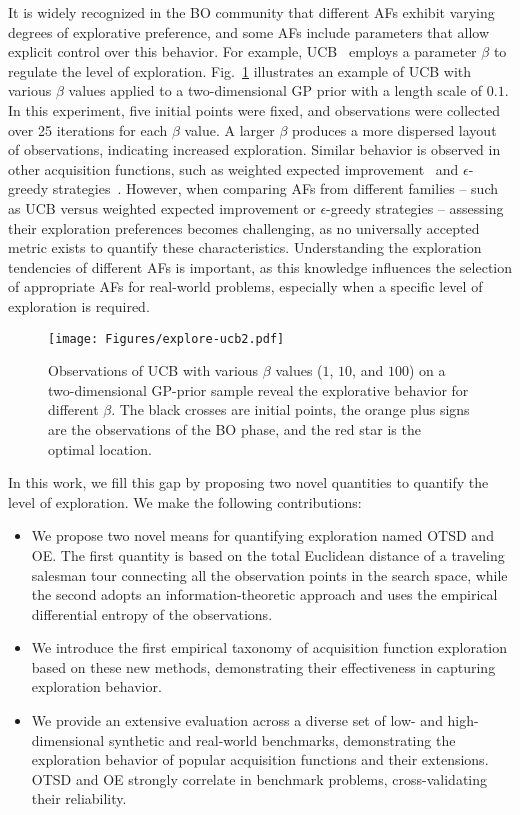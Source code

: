 \documentclass[accepted]{uai2025}
\begin{document}
It is widely recognized in the \ac{BO} community that different \acp{AF} exhibit varying degrees of explorative preference, and some \acp{AF} include parameters that allow explicit control over this behavior. For example, \ac{UCB}~\citep{srinivas2010gaussian} employs a parameter $\beta$ to regulate the level of exploration. Fig.~\ref{fig:intro_ucb} illustrates an example of \ac{UCB} with various $\beta$ values applied to a two-dimensional GP prior with a length scale of $0.1$. In this experiment, five initial points were fixed, and observations were collected over 25 iterations for each $\beta$ value. A larger $\beta$ produces a more dispersed layout of observations, indicating increased exploration. Similar behavior is observed in other acquisition functions, such as weighted expected improvement~\citep{sobester2005design} and $\epsilon$-greedy strategies~\citep{sutton2018reinforcement}. However, when comparing \acp{AF} from different families -- such as \ac{UCB} versus weighted expected improvement or $\epsilon$-greedy strategies -- assessing their exploration preferences becomes challenging, as no universally accepted metric exists to quantify these characteristics. Understanding the exploration tendencies of different \acp{AF} is important, as this knowledge influences the selection of appropriate \acp{AF} for real-world problems, especially when a specific level of exploration is required.


\begin{figure}[tb]
	\centering
	\texttt{[image: Figures/explore-ucb2.pdf]}
	\caption{
    Observations of \acs{UCB} with various $\beta$ values ($1$, $10$, and $100$) on a two-dimensional \ac{GP}-prior sample reveal the explorative behavior for different $\beta$. The black crosses are initial points, the orange plus signs are the observations of the \ac{BO} phase, and the red star is the optimal location.
    }
	\label{fig:intro_ucb}
\end{figure}

In this work, we fill this gap by proposing two novel quantities to quantify the level of exploration.
We make the following contributions:
\begin{itemize}[wide, leftmargin=*]
    \item We propose two novel means for quantifying exploration named \ac{OTSD} and \ac{OE}. 
    The first quantity is based on the total Euclidean distance of a traveling salesman tour connecting all the observation points in the search space, while the second adopts an information-theoretic approach and uses the empirical differential entropy of the observations.
    \item We introduce the first empirical taxonomy of acquisition function exploration based on these new methods, demonstrating their effectiveness in capturing exploration behavior.
    \item 
    We provide an extensive evaluation across a diverse set of low- and high-dimensional synthetic and real-world benchmarks, demonstrating the exploration behavior of popular acquisition functions and their extensions. \ac{OTSD} and \ac{OE} strongly correlate in benchmark problems, cross-validating their reliability.
\end{itemize}
\end{document}
